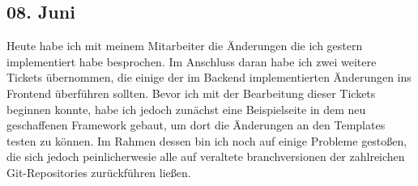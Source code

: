 \subsection{08. Juni}
Heute habe ich mit meinem Mitarbeiter die Änderungen die ich gestern implementiert habe besprochen. Im Anschluss daran habe ich zwei weitere Tickets übernommen, die einige der im Backend implementierten Änderungen ins Frontend überführen sollten. Bevor ich mit der Bearbeitung dieser Tickets beginnen konnte, habe ich jedoch zunächst eine Beispielseite in dem neu geschaffenen Framework gebaut, um dort die Änderungen an den Templates testen zu können. Im Rahmen dessen bin ich noch auf einige Probleme gestoßen, die sich jedoch peinlicherwesie alle auf veraltete branchversionen der zahlreichen Git-Repositories zurückführen ließen.